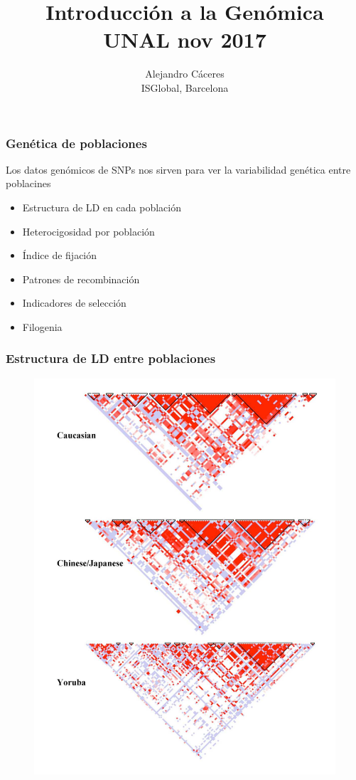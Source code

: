 \documentclass{beamer}\usepackage[]{graphicx}\usepackage[]{color}
\begin{document}
\title{Introducci\'on a la Gen\'omica \\ UNAL nov 2017}
\author{Alejandro C\'aceres \\ ISGlobal, Barcelona}


\maketitle


\begin{frame}[fragile]
\frametitle{Gen\'etica de poblaciones}

Los datos gen\'omicos de SNPs nos sirven para ver la variabilidad gen\'etica entre poblacines
\begin{itemize}
\item Estructura de LD en cada poblaci\'on
\item Heterocigosidad por poblaci\'on
\item \'Indice de fijaci\'on
\item Patrones de recombinaci\'on
\item Indicadores de selecci\'on
\item Filogenia
\end{itemize}
\end{frame}


\begin{frame}[fragile]
\frametitle{Estructura de LD entre poblaciones}

\begin{figure}[htbp]
\begin{center}
\includegraphics[width=.5\linewidth]{mozscreenshot141.pdf}
\end{center}
\end{figure}
\end{frame}
\end{document}
